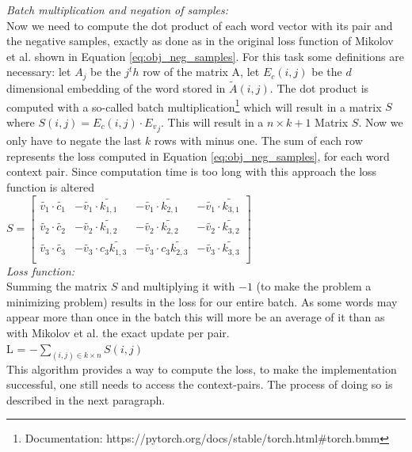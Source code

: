 \textit{Batch multiplication and negation of samples:}\\
Now we need to compute the dot product of each word vector with its pair and the negative samples, exactly as done as in the original loss function of Mikolov et al. shown in Equation \ref{eq:obj_neg_samples}. For this task some definitions are necessary: let $A_j$ be the $j^th$ row of the matrix A, let $E_c(i,j)$ be the $d$ dimensional embedding of the word stored in $\tilde{A}(i,j)$. The dot product is computed with a so-called batch multiplication\footnote{Documentation: https://pytorch.org/docs/stable/torch.html\#torch.bmm} which will result in a matrix $S$ where $S(i,j) = E_c(i,j) \cdot {E_v}_j$. This will result in a $n\times k+1$ Matrix $S$. Now we only have to negate the last $k$ rows with minus one. The sum of each row represents the loss computed in Equation \ref{eq:obj_neg_samples}, for each word context pair.
Since computation time is too long with this approach the loss function is altered\\
$S = \begin{bmatrix}
\tilde{v_1} \cdot \tilde{c_1} & -\tilde{v_1} \cdot \tilde{k_{1,1}} & -\tilde{v_1} \cdot \tilde{k_{2,1}}& -\tilde{v_1} \cdot \tilde{k_{3,1}}\\
\tilde{v_2} \cdot \tilde{c_2} & -\tilde{v_2} \cdot \tilde{k_{1,2}} & -\tilde{v_2} \cdot \tilde{k_{2,2}} & -\tilde{v_2} \cdot \tilde{k_{3,2}}\\
\tilde{v_3} \cdot \tilde{c_3} &-\tilde{v_3} \cdot c_3 \tilde{k_{1,3}} & -\tilde{v_3} \cdot c_3 \tilde{k_{2,3}}&-\tilde{v_3} \cdot \tilde{k_{3,3}}\\
\end{bmatrix}$\\

\textit{Loss function:}\\
Summing the matrix $S$ and multiplying it with $-1$ (to make the problem a minimizing problem) results in the loss for our entire batch. As some words may appear more than once in the batch this will more be an average of it than as with Mikolov et al. \cite{mikolov2} the exact update per pair. \\
L = $- \sum_{(i,j) \in k \times n} S(i,j) $\\

This algorithm provides a way to compute the loss, to make the implementation successful, one still needs to access the context-pairs. The process of doing so is described in the next paragraph.